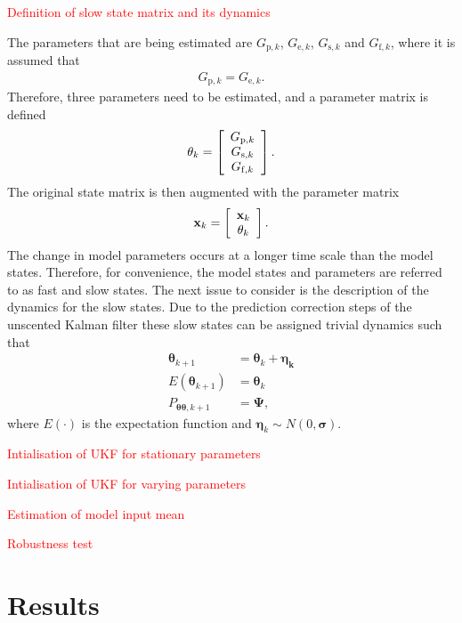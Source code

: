 \documentclass{article}%
\newcommand\red{\textcolor{red}}
\begin{document}
\red{Definition of slow state matrix and its dynamics}

The parameters that are being estimated are $G_{\mathrm{p},k}$, $G_{\mathrm{e},k}$, $G_{\mathrm{s},k}$ and $G_{\mathrm{f},k}$, where it is assumed that \begin{align}
G_{\mathrm{p},k} = G_{\mathrm{e},k}.
\end{align} Therefore, three parameters need to be estimated, and a parameter matrix is defined
\[ \mathbf{\theta}_{k} = \left[ \begin{array}[pos]{c}
G_{\mathrm{p},k}\\
G_{\mathrm{s},k} \\
G_{\mathrm{f},k} \end{array} \right] .\] The original state matrix is then augmented with the parameter matrix 
\[ \mathbf{x}_{k} = \left[ \begin{array}[pos]{c}
\mathbf{x}_{k}\\
\mathbf{\theta}_{k} \end{array} \right] .\] The change in model parameters occurs at a longer time scale than the model states. Therefore, for convenience, the model states and parameters are referred to as fast and slow states. The next issue to consider is the description of the dynamics for the slow states. Due to the prediction correction steps of the unscented Kalman filter these slow states can be assigned trivial dynamics such that
\begin{align}
\label{eqn: parameterdynamics}
\mathbf{\theta}_{k+1} &= \mathbf{\theta}_{k} + \mathbf{\eta_{k}}\\
E(\mathbf{\theta}_{k+1}) &= \mathbf{\theta}_{k}\\
P_{\mathbf{\theta} \mathbf{\theta},k+1} &= \mathbf{\Psi},
\end{align} where $E(\cdot)$ is the expectation function and $\mathbf{\eta}_{k} \sim N(0,\mathbf{\sigma})$.

\red{Intialisation of UKF for stationary parameters}

\red{Intialisation of UKF for varying parameters}

\red{Estimation of model input mean}

\red{Robustness test}

\section{Results}
\end{document}
